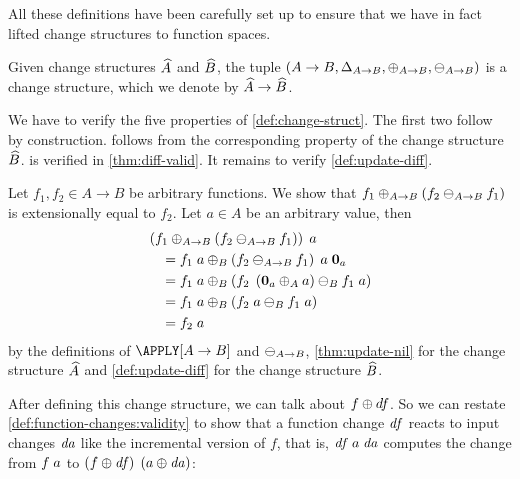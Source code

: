 All these definitions have been carefully set up to ensure that we have
in fact lifted change structures to function spaces.


\begin{theorem}
  \label{thm:func-changestruct}
  Given change structures $\widehat{A}$ and $\widehat{B}$, the tuple $(A \to B, \CHANGE[A
  \to B], \UPDATE[A \to B], \DIFF[A \to B])$ is a
  change structure, which we denote by $\widehat{A} \to \widehat{B}$.
\end{theorem}

\begin{optionalproof}
  We have to verify the five properties of
  \cref{def:change-struct}. The first two follow by
  construction.  follows from the corresponding
  property of the change structure $\widehat{B}$.  is
  verified in \cref{thm:diff-valid}. It remains to verify
  \cref{def:update-diff}.

  Let $f_1, f_2 \in A \to B$ be arbitrary functions. We show that
  $\Apply[A \to B]{\Diff*[A \to B]{f_2}{f_1}}{f_1}$ is
  extensionally equal to $f_2$. Let $a \in A$ be an arbitrary
  value, then
  \begin{align*}
    & \App{\Apply*[A \to B]{\Diff*[A \to B]{f_2}{f_1}}{f_1}}{a}\\
    & \quad = \Apply[B]
                {\App{\App{\Diff*[A \to B]{f_2}{f_1}}{a}}{\Nil[A]{a}}}
                {\App{f_1}{a}}\\
    & \quad = \Apply[B]
                {\Diff*[B]{\App{f_2}{\Apply*[A]{a}{\Nil[A]{a}}}}{\App{f_1}{a}}}
                {\App{f_1}{a}}\\
    & \quad = \Apply[B]
                {\Diff*[B]{\App{f_2}{a}}{\App{f_1}{a}}}
                {\App{f_1}{a}}\\
    & \quad = \App{f_2}{a}
  \end{align*}
  by the definitions of $\APPLY[A \to B]$ and $\DIFF[A \to B]$,
  \cref{thm:update-nil} for the change structure $\widehat{A}$ and
  \cref{def:update-diff} for the change structure $\widehat{B}$.
\end{optionalproof}

After defining this change structure, we can talk about $f
\UPDATE df$. So we can restate \cref{def:function-changes:validity}
to show that a function change $\mathit{df}$ reacts to
%
input changes $\mathit{da}$ like the incremental version of $f$, that is,
$\App{\App{\D f}{a}}{\D a}$ computes the change from
$\App{f}{a}$ to
$\App{\Apply*{\D f}{f}}{\Apply*{\D a}{a}}$:

